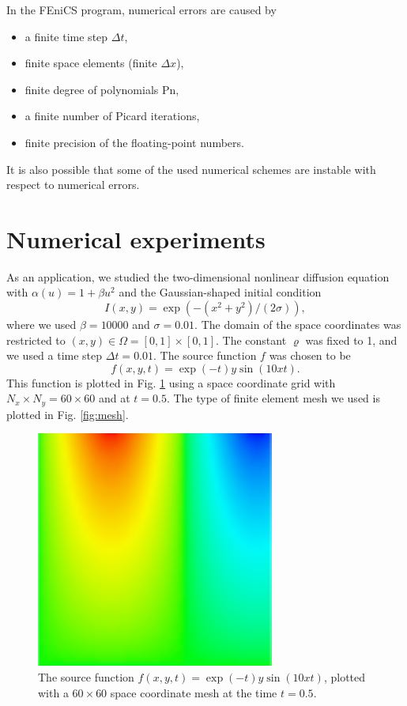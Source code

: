 \documentclass[twoside]{article}
\begin{document}
In the FEniCS program, numerical errors are caused by 
\begin{itemize}
  \item a finite time step $\Delta t$,
  \item finite space elements (finite $\Delta x$),
  \item finite degree of polynomials Pn,
  \item a finite number of Picard iterations,
  \item finite precision of the floating-point numbers.
\end{itemize}
It is also possible that some of the used numerical schemes are instable with respect to numerical errors.


\section{Numerical experiments}


As an application, we studied the two-dimensional nonlinear diffusion equation with $\alpha(u) = 1 + \beta u^{2}$ and the Gaussian-shaped initial condition
\begin{equation}
  I(x, y) = \exp\left( -(x^{2} + y^{2})/(2\sigma )\right),
\end{equation} 
where we used $\beta = 10000$ and $\sigma = 0.01$. The domain of the space coordinates was restricted to $(x, y) \in \Omega = [0, 1]\times [0, 1]$. The constant $\varrho $ was fixed to 1, and we used a time step $\Delta t = 0.01$. The source function  $f$ was chosen to be
\begin{equation}
  f(x, y, t) = \exp(-t)y\sin(10xt). 
\end{equation}
This function is plotted in Fig. \ref{fig:f_t0.5} using a space coordinate grid with $N_{x} \times N_{y} = 60 \times 60$ and at $t = 0.5$. The type of finite element mesh we used is plotted in Fig. \ref{fig:mesh}.

\begin{figure} 
  \centering
  \includegraphics[scale=0.6]{figures/f_expxsinxt_60x60/f_expxsinxt_60x60_t0p5.pdf}
  \caption{The source function $f(x, y, t) = \exp(-t)y\sin(10xt)$, plotted with a $60 \times 60$ space coordinate mesh at the time $t = 0.5$.} \label{fig:f_t0.5}
\end{figure}
\end{document}
